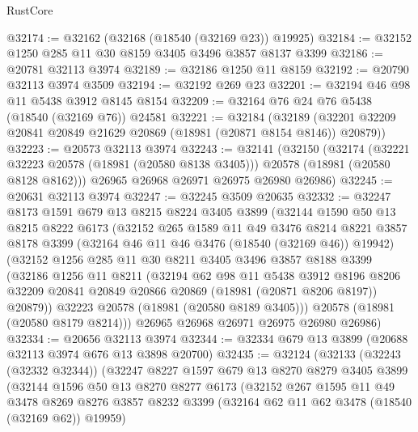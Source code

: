 \begin{lexlean}{RustCore}
\begin{coremodule}
@32174 := @32162 (@32168 (@18540 (@32169 @23)) @19925)
@32184 := @32152 @1250 @285 @11 @30 @8159 @3405 @3496 @3857 @8137 @3399
@32186 := @20781 @32113 @3974
@32189 := @32186 @1250 @11 @8159
@32192 := @20790 @32113 @3974 @3509
@32194 := @32192 @269 @23
@32201 := @32194 @46 @98 @11 @5438 @3912 @8145 @8154
@32209 := @32164 @76 @24 @76 @5438 (@18540 (@32169 @76)) @24581
@32221 := @32184
    (@32189 (@32201 @32209 @20841 @20849 @21629 @20869 (@18981 (@20871 @8154 @8146)) @20879))
@32223 := @20573 @32113 @3974
@32243 := @32141
    (@32150
      (@32174
        (@32221 @32223 @20578 (@18981 (@20580 @8138 @3405)))
        @20578
        (@18981 (@20580 @8128 @8162)))
      @26965
      @26968
      @26971
      @26975
      @26980
      @26986)
@32245 := @20631 @32113 @3974
@32247 := @32245 @3509 @20635
@32332 := @32247
    @8173
    @1591
    @679
    @13
    @8215
    @8224
    @3405
    @3899
    (@32144
      @1590
      @50
      @13
      @8215
      @8222
      @6173
      (@32152
        @265
        @1589
        @11
        @49
        @3476
        @8214
        @8221
        @3857
        @8178
        @3399
        (@32164 @46 @11 @46 @3476 (@18540 (@32169 @46)) @19942)
        (@32152
          @1256
          @285
          @11
          @30
          @8211
          @3405
          @3496
          @3857
          @8188
          @3399
          (@32186
            @1256
            @11
            @8211
            (@32194
              @62
              @98
              @11
              @5438
              @3912
              @8196
              @8206
              @32209
              @20841
              @20849
              @20866
              @20869
              (@18981 (@20871 @8206 @8197))
              @20879))
          @32223
          @20578
          (@18981 (@20580 @8189 @3405)))
        @20578
        (@18981 (@20580 @8179 @8214)))
      @26965
      @26968
      @26971
      @26975
      @26980
      @26986)
@32334 := @20656 @32113 @3974
@32344 := @32334 @679 @13 @3899 (@20688 @32113 @3974 @676 @13 @3898 @20700)
@32435 := @32124
    (@32133
      (@32243 (@32332 @32344))
      (@32247
        @8227
        @1597
        @679
        @13
        @8270
        @8279
        @3405
        @3899
        (@32144
          @1596
          @50
          @13
          @8270
          @8277
          @6173
          (@32152
            @267
            @1595
            @11
            @49
            @3478
            @8269
            @8276
            @3857
            @8232
            @3399
            (@32164 @62 @11 @62 @3478 (@18540 (@32169 @62)) @19959)

\end{coremodule}
\end{lexlean}
